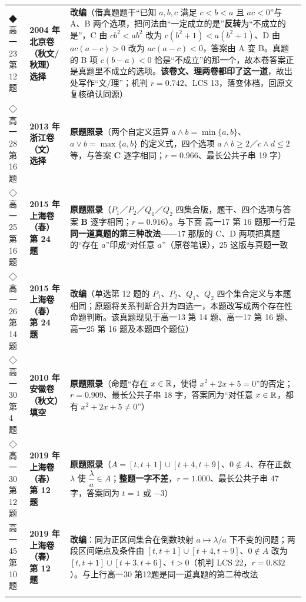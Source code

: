 \documentclass[a4paper,11pt]{article}
\begin{document}
\begin{xltabular}{\textwidth}{@{}>{\raggedright\arraybackslash}p{2.85cm}>{\raggedright\arraybackslash}p{3.99cm}>{\raggedright\arraybackslash}p{7.89cm}@{}}
◆高一23 第 12 题 & \textbf{2004 年北京卷（秋文/秋理）选择} & \textbf{改编}（借真题题干``已知 \(a,b,c\) 满足 \(c<b<a\) 且 \(ac<0\)''与 A、B 两个选项，把问法由``一定成立的是''\textbf{反转}为``不成立的是''，C 由 \(cb^2<ab^2\) 改为 \(c(b^2+\allowbreak 1)<a(b^2+\allowbreak 1)\)、D 由 \(ac(a-c)>0\) 改为 \(ac(a-c)<0\)，答案由 A 变 B。真题的 B 项 \(c(b-a)<0\) 恰是``不成立''的那一个，故本卷答案正是真题里不成立的选项。\textbf{该卷文、理两卷都印了这一道}，故出处写作``文/理''；机判 \(r=\allowbreak 0.742\)、LCS 13，落变体档，回原文复核确认同源） \\ \addlinespace[1pt]
◇高一28 第 16 题 & \textbf{2013 年浙江卷（文）选择} & \textbf{原题照录}（两个自定义运算 \(a\wedge b=\allowbreak \min\{a,b\}\)、\(a\vee b=\allowbreak \max\{a,b\}\) 的定义式，四个选项 \(a\wedge b\geqslant\allowbreak 2\)／\(c\wedge d\leqslant\allowbreak 2\) 等，与答案 \textbf{C} 逐字相同；\(r=\allowbreak 0.966\)、最长公共子串 19 字） \\ \addlinespace[1pt]
◇高一25 第 16 题 & \textbf{2015 年上海卷（春）第 24 题} & \textbf{原题照录}（\(P_1\)／\(P_2\)／\(Q_1\)／\(Q_2\) 四集合版，题干、四个选项与答案 \textbf{B} 逐字相同；\(r=\allowbreak 0.916\)）。与下面 高一17 第 16 题那一行是\textbf{同一道真题的第三种改法}------17 那版的 C、D 两项把真题的``存在 \(a\)''印成``对任意 \(a\)''（原卷笔误），25 这版与真题一致 \\ \addlinespace[1pt]
◇高一26 第 14 题 & \textbf{2015 年上海卷（春）第 24 题} & \textbf{改编}（单选第 12 题的 \(P_1\)、\(P_2\)、\(Q_1\)、\(Q_2\) 四个集合定义与本题相同；原题将关系判断合并为四选一，本题改写成两个存在性命题判断。该真题现见于高一13 第 14 题、高一17 第 16 题、高一25 第 16 题及本题四个题位） \\ \addlinespace[1pt]
◇高一30 第 4 题 & \textbf{2010 年安徽卷（秋文）填空} & \textbf{原题照录}（命题``存在 \(x\in\mathbb{R}\)，使得 \(x^2+\allowbreak 2x+\allowbreak 5=\allowbreak 0\)''的否定；\(r=\allowbreak 0.909\)、最长公共子串 18 字，答案同为``对任意 \(x\in\mathbb{R}\)，都有 \(x^2+\allowbreak 2x+\allowbreak 5\neq0\)''） \\ \addlinespace[1pt]
◇高一30 第 12 题 & \textbf{2019 年上海卷（春）第 12 题} & \textbf{原题照录}（\(A=\allowbreak [t,t+\allowbreak 1]\cup\allowbreak [t+\allowbreak 4,t+\allowbreak 9]\)、\(0\notin A\)、存在正数 \(\lambda\) 使 \(\dfrac\lambda a\in A\)；\textbf{整题一字不差}，\(r=\allowbreak 1.000\)、最长公共子串 47 字，答案同为 \(t=\allowbreak 1\) 或 \(-3\)） \\ \addlinespace[1pt]
高一45 第 10 题 & \textbf{2019 年上海卷（春）第 12 题} & \textbf{改编}：同为正区间集合在倒数映射 \(a\mapsto\lambda/a\) 下不变的问题；两段区间端点及条件由 \([t,t+\allowbreak 1]\cup\allowbreak [t+\allowbreak 4,t+\allowbreak 9]\)、\(0\notin A\) 改为 \([t,t+\allowbreak 1]\cup\allowbreak [t+\allowbreak 3,t+\allowbreak 6]\)、\(t>0\)（机判 LCS 22，\(r=\allowbreak 0.832\)）。与上行高一30 第12题是同一道真题的第二种改法 \\ \addlinespace[1pt]

\end{xltabular}
\end{document}

